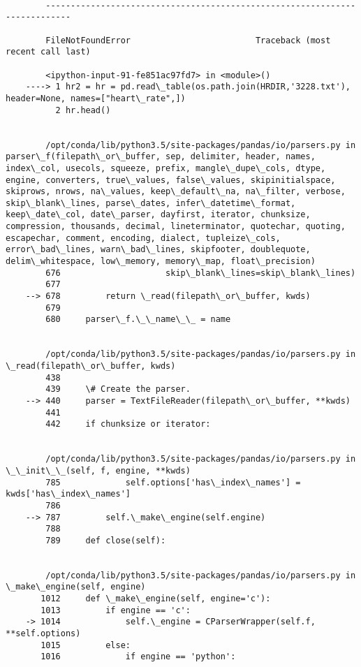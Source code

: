 \documentclass[11pt]{article}
\begin{document}
    \begin{Verbatim}[commandchars=\\\{\}]

        ---------------------------------------------------------------------------

        FileNotFoundError                         Traceback (most recent call last)

        <ipython-input-91-fe851ac97fd7> in <module>()
    ----> 1 hr2 = hr = pd.read\_table(os.path.join(HRDIR,'3228.txt'), header=None, names=["heart\_rate",])
          2 hr.head()


        /opt/conda/lib/python3.5/site-packages/pandas/io/parsers.py in parser\_f(filepath\_or\_buffer, sep, delimiter, header, names, index\_col, usecols, squeeze, prefix, mangle\_dupe\_cols, dtype, engine, converters, true\_values, false\_values, skipinitialspace, skiprows, nrows, na\_values, keep\_default\_na, na\_filter, verbose, skip\_blank\_lines, parse\_dates, infer\_datetime\_format, keep\_date\_col, date\_parser, dayfirst, iterator, chunksize, compression, thousands, decimal, lineterminator, quotechar, quoting, escapechar, comment, encoding, dialect, tupleize\_cols, error\_bad\_lines, warn\_bad\_lines, skipfooter, doublequote, delim\_whitespace, low\_memory, memory\_map, float\_precision)
        676                     skip\_blank\_lines=skip\_blank\_lines)
        677 
    --> 678         return \_read(filepath\_or\_buffer, kwds)
        679 
        680     parser\_f.\_\_name\_\_ = name


        /opt/conda/lib/python3.5/site-packages/pandas/io/parsers.py in \_read(filepath\_or\_buffer, kwds)
        438 
        439     \# Create the parser.
    --> 440     parser = TextFileReader(filepath\_or\_buffer, **kwds)
        441 
        442     if chunksize or iterator:


        /opt/conda/lib/python3.5/site-packages/pandas/io/parsers.py in \_\_init\_\_(self, f, engine, **kwds)
        785             self.options['has\_index\_names'] = kwds['has\_index\_names']
        786 
    --> 787         self.\_make\_engine(self.engine)
        788 
        789     def close(self):


        /opt/conda/lib/python3.5/site-packages/pandas/io/parsers.py in \_make\_engine(self, engine)
       1012     def \_make\_engine(self, engine='c'):
       1013         if engine == 'c':
    -> 1014             self.\_engine = CParserWrapper(self.f, **self.options)
       1015         else:
       1016             if engine == 'python':



\end{Verbatim}
\end{document}
